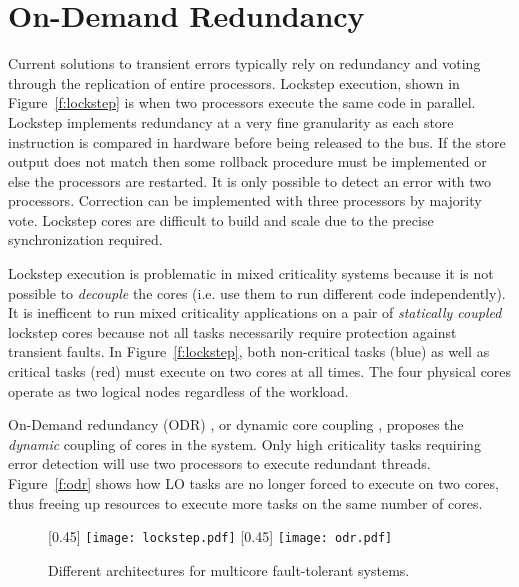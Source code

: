 \section{On-Demand Redundancy}

	Current solutions to transient errors typically rely on redundancy and voting through the replication of entire processors. 
	Lockstep execution, shown in Figure~\ref{f:lockstep} is when two processors execute the same code in parallel. 
	Lockstep implements redundancy at a very fine granularity as each store instruction is compared in hardware before being released to the bus. 
	If the store output does not match then some rollback procedure must be implemented or else the processors are restarted. 
	It is only possible to detect an error with two processors. 
	Correction can be implemented with three processors by majority vote. Lockstep cores are difficult to build and scale due to the precise synchronization required.

	Lockstep execution is problematic in mixed criticality systems because it is not possible to \emph{decouple} the cores (i.e. use them to run different code independently). 
	It is inefficent to run mixed criticality applications on a pair of \emph{statically coupled} lockstep cores because not all tasks necessarily require protection against transient faults. 
	In Figure~\ref{f:lockstep}, both non-critical tasks (blue) as well as critical tasks (red) must execute on two cores at all times. 	
	The four physical cores operate as two logical nodes regardless of the workload.

	On-Demand redundancy (ODR) \cite{Meyer:CASES11,fu2013demand}, or dynamic core coupling \cite{lafrieda2007utilizing}, proposes the \emph{dynamic} coupling of cores in the system. 
	Only high criticality tasks requiring error detection will use two processors to execute redundant threads. 
	Figure~\ref{f:odr} shows how LO tasks are no longer forced to execute on two cores, thus freeing up resources to execute more tasks on the same number of cores.


\begin{figure}
\captionsetup[subfigure]{singlelinecheck=false}
\centering
{}[0.45\textwidth]
{
    \texttt{[image: lockstep.pdf]}
}%
\hfill
{}[0.45\textwidth]
{
    \texttt{[image: odr.pdf]}
}%
\caption[Short Caption]{Different architectures for multicore fault-tolerant systems.}
\label{f:ft-arch}
\end{figure}


